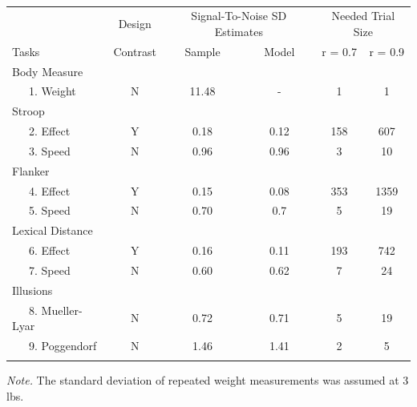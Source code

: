 \documentclass[
  ,man]{apa6}
\begin{document}
\begin{table}[tbp]

\begin{center}
\begin{threeparttable}

\caption{\label{tab:allTasks}}

\begin{tabular}{lccccc}
\toprule
 & \multicolumn{1}{c}{Design} & \multicolumn{2}{c}{Signal-To-Noise SD
                        Estimates} & \multicolumn{2}{c}{Needed Trial Size} \\
\cmidrule(r){2-2} \cmidrule(r){3-4} \cmidrule(r){5-6}
Tasks & \multicolumn{1}{c}{Contrast} & \multicolumn{1}{c}{Sample} & \multicolumn{1}{c}{Model} & \multicolumn{1}{c}{r = 0.7} & \multicolumn{1}{c}{r = 0.9}\\
\midrule
Body Measure &  &  &  &  & \\
\ \ \ 1. Weight & N & 11.48 & - & 1 & 1\\
Stroop &  &  &  &  & \\
\ \ \ 2. Effect & Y & 0.18 & 0.12 & 158 & 607\\
\ \ \ 3. Speed & N & 0.96 & 0.96 & 3 & 10\\
Flanker &  &  &  &  & \\
\ \ \ 4. Effect & Y & 0.15 & 0.08 & 353 & 1359\\
\ \ \ 5. Speed & N & 0.70 & 0.7 & 5 & 19\\
Lexical Distance &  &  &  &  & \\
\ \ \ 6. Effect & Y & 0.16 & 0.11 & 193 & 742\\
\ \ \ 7. Speed & N & 0.60 & 0.62 & 7 & 24\\
Illusions &  &  &  &  & \\
\ \ \ 8. Mueller-Lyar & N & 0.72 & 0.71 & 5 & 19\\
\ \ \ 9. Poggendorf & N & 1.46 & 1.41 & 2 & 5\\
\bottomrule
\addlinespace
\end{tabular}

\begin{tablenotes}[para]
\normalsize{\textit{Note.} The standard deviation of repeated weight measurements was assumed at 3 lbs.}
\end{tablenotes}

\end{threeparttable}
\end{center}

\end{table}
\end{document}
